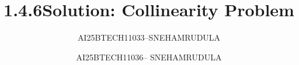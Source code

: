 \documentclass[journal]{IEEEtran}
\begin{document}

\vspace{3cm}

\title{1.4.6}
\author{AI25BTECH11033--SNEHAMRUDULA}
 \maketitle
{\let\newpage\relax\maketitle}

\renewcommand{\thefigure}{\theenumi}
\renewcommand{\thetable}{\theenumi}
\setlength{\intextsep}{10pt} %


\renewcommand{\thetable}{\theenumi}


\title{Solution: Collinearity Problem}
\author{AI25BTECH11036-- SNEHAMRUDULA}
\date{}
\end{document}
